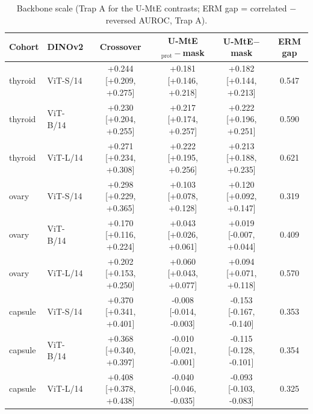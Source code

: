 \begin{table}[H]\centering\scriptsize
\caption{Backbone scale (Trap A for the U-MtE contrasts; ERM gap = correlated $-$ reversed AUROC, Trap A).}\label{tab:scale}
\begin{tabular}{llcccc}\toprule
Cohort & DINOv2 & Crossover & U-MtE$_{\text{prot}}-$mask & U-MtE$-$mask & ERM gap \\\midrule
thyroid & ViT-S/14 & +0.244 [+0.209, +0.275] & +0.181 [+0.146, +0.218] & +0.182 [+0.144, +0.213] & 0.547 \\
thyroid & ViT-B/14 & +0.230 [+0.204, +0.255] & +0.217 [+0.174, +0.257] & +0.222 [+0.196, +0.251] & 0.590 \\
thyroid & ViT-L/14 & +0.271 [+0.234, +0.308] & +0.222 [+0.195, +0.256] & +0.213 [+0.188, +0.235] & 0.621 \\
ovary & ViT-S/14 & +0.298 [+0.229, +0.365] & +0.103 [+0.078, +0.128] & +0.120 [+0.092, +0.147] & 0.319 \\
ovary & ViT-B/14 & +0.170 [+0.116, +0.224] & +0.043 [+0.026, +0.061] & +0.019 [-0.007, +0.044] & 0.409 \\
ovary & ViT-L/14 & +0.202 [+0.153, +0.250] & +0.060 [+0.043, +0.077] & +0.094 [+0.071, +0.118] & 0.570 \\
capsule & ViT-S/14 & +0.370 [+0.341, +0.401] & -0.008 [-0.014, -0.003] & -0.153 [-0.167, -0.140] & 0.353 \\
capsule & ViT-B/14 & +0.368 [+0.340, +0.397] & -0.010 [-0.021, -0.001] & -0.115 [-0.128, -0.101] & 0.354 \\
capsule & ViT-L/14 & +0.408 [+0.378, +0.438] & -0.040 [-0.046, -0.035] & -0.093 [-0.103, -0.083] & 0.325 \\
\bottomrule\end{tabular}\end{table}

